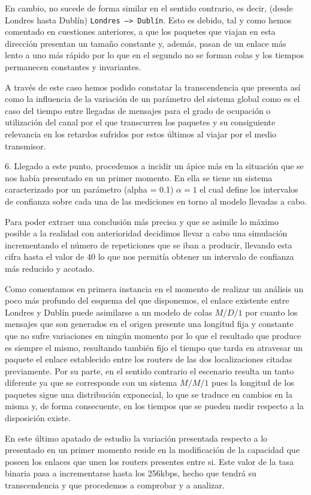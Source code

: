 En cambio, no sucede de forma similar en el sentido contrario, es decir, (desde Londres hasta Dublín) \texttt{Londres --> Dublín}. Esto es debido, tal y como hemos comentado en cuestiones anteriores, a que los paquetes que viajan en esta dirección presentan un tamaño constante y, además, pasan de un enlace más lento a uno más rápido por lo que en el segundo no se forman colas y los tiempos permanecen constantes y invariantes.

A través de este caso hemos podido constatar la transcendencia que presenta así como la influencia de la variación de un parámetro del sistema global como es el caso del tiempo entre llegadas de mensajes para el grado de ocupación o utilización del canal por el que transcurren los paquetes y su consiguiente relevancia en los retardos sufridos por estos últimos al viajar por el medio transmisor.

6.
Llegado a este punto, procedemos a incidir un ápice más en la situación que se nos había presentado en un primer momento. En ella se tiene un sistema caracterizado por un parámetro (alpha = 0.1) $\alpha = 1$ el cual define los intervalos de confianza sobre cada una de las mediciones en torno al modelo llevadas a cabo.

Para poder extraer una conclusión más precisa y que se asimile lo máximo posible a la realidad con anterioridad decidimos llevar a cabo una simulación incrementando el número de repeticiones que se iban a producir, llevando esta cifra hasta el valor de 40 lo que nos permitía obtener un intervalo de confianza más reducido y acotado.

Como comentamos en primera instancia en el momento de realizar un análisis un poco más profundo del esquema del que disponemos, el enlace existente entre Londres y Dublín puede asimilarse a un modelo de colas $M/D/1$ por cuanto los mensajes que son generados en el origen presente una longitud fija y constante que no sufre variaciones en ningún momento por lo que el resultado que produce es siempre el mismo, resultando también fijo el tiempo que tarda en atravesar un paquete el enlace establecido entre los routers de las dos localizaciones citadas previamente. Por su parte, en el sentido contrario el escenario resulta un tanto diferente ya que se corresponde con un sistema $M/M/1$ pues la longitud de los paquetes sigue una distribución exponecial, lo que se traduce en cambios en la misma y, de forma consecuente, en los tiempos que se pueden medir respecto a la disposición existe.

En este último apatado de estudio la variación presentada respecto a lo presentado en un primer momento reside en la modificación de la capacidad que poseen los enlaces que unen los routers presentes entre si. Este valor de la tasa binaria pasa a incrementarse hasta los 256kbps, hecho que tendrá su transcendencia y que procedemos a comprobar y a analizar.


